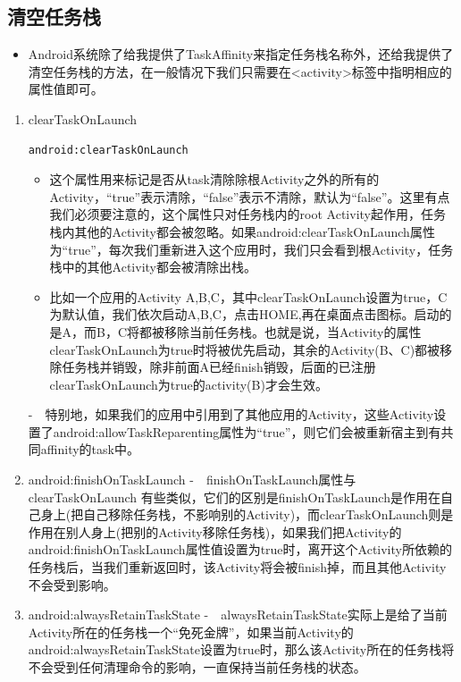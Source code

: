 \documentclass[9pt, b5paaper]{book}
\begin{document}
\subsection{清空任务栈}
\label{sec-4-9-3}
\begin{itemize}
\item Android系统除了给我提供了TaskAffinity来指定任务栈名称外，还给我提供了清空任务栈的方法，在一般情况下我们只需要在<activity>标签中指明相应的属性值即可。
\end{itemize}
\begin{enumerate}
\item clearTaskOnLaunch
\label{sec-4-9-3-1}
\begin{verbatim}
android:clearTaskOnLaunch
\end{verbatim}
\begin{itemize}
\item 这个属性用来标记是否从task清除除根Activity之外的所有的Activity，“true”表示清除，“false”表示不清除，默认为“false”。这里有点我们必须要注意的，这个属性只对任务栈内的root Activity起作用，任务栈内其他的Activity都会被忽略。如果android:clearTaskOnLaunch属性为“true”，每次我们重新进入这个应用时，我们只会看到根Activity，任务栈中的其他Activity都会被清除出栈。
\item 比如一个应用的Activity A,B,C，其中clearTaskOnLaunch设置为true，C为默认值，我们依次启动A,B,C，点击HOME,再在桌面点击图标。启动的是A，而B，C将都被移除当前任务栈。也就是说，当Activity的属性clearTaskOnLaunch为true时将被优先启动，其余的Activity(B、C)都被移除任务栈并销毁，除非前面A已经finish销毁，后面的已注册clearTaskOnLaunch为true的activity(B)才会生效。
\end{itemize}
- 特别地，如果我们的应用中引用到了其他应用的Activity，这些Activity设置了android:allowTaskReparenting属性为“true”，则它们会被重新宿主到有共同affinity的task中。
\item android:finishOnTaskLaunch
\label{sec-4-9-3-2}
- finishOnTaskLaunch属性与clearTaskOnLaunch 有些类似，它们的区别是finishOnTaskLaunch是作用在自己身上(把自己移除任务栈，不影响别的Activity)，而clearTaskOnLaunch则是作用在别人身上(把别的Activity移除任务栈)，如果我们把Activity的android:finishOnTaskLaunch属性值设置为true时，离开这个Activity所依赖的任务栈后，当我们重新返回时，该Activity将会被finish掉，而且其他Activity不会受到影响。
\item android:alwaysRetainTaskState
\label{sec-4-9-3-3}
- alwaysRetainTaskState实际上是给了当前Activity所在的任务栈一个“免死金牌”，如果当前Activity的android:alwaysRetainTaskState设置为true时，那么该Activity所在的任务栈将不会受到任何清理命令的影响，一直保持当前任务栈的状态。
\end{enumerate}
\end{document}
